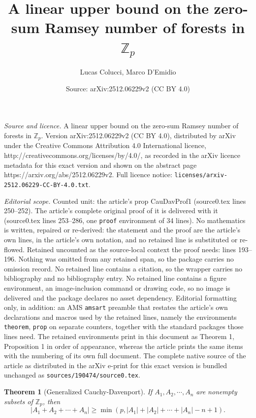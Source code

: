 \documentclass[10pt,a4paper]{amsart}
\title{A linear upper bound on the zero-sum Ramsey number of forests in $\mathbb{Z}_p$}
\author{Lucas Colucci, Marco D'Emidio}
\date{Source: arXiv:2512.06229v2 (CC BY 4.0)}
\newtheorem{theorem}{Theorem}
\begin{document}
\maketitle

\noindent\emph{Source and licence.} A linear upper bound on the zero-sum Ramsey number of forests in $\mathbb{Z}_p$. Version arXiv:2512.06229v2 (CC BY 4.0), distributed by arXiv under the Creative Commons Attribution 4.0 International licence, http://creativecommons.org/licenses/by/4.0/, as recorded in the arXiv licence metadata for this exact version and shown on the abstract page https://arxiv.org/abs/2512.06229v2. Full licence notice: \texttt{licenses/arxiv-2512.06229-CC-BY-4.0.txt}.\par\smallskip

\noindent\textit{Editorial scope.} Counted unit: the article's prop CauDavProf1 (source0.tex lines 250--252). The article's complete original proof of it is delivered with it (source0.tex lines 253--286, one \texttt{proof} environment of 34 lines). No mathematics is written, repaired or re-derived: the statement and the proof are the article's own lines, in the article's own notation, and no retained line is substituted or re-flowed.  Retained uncounted as the source-local context the proof needs: lines 193--196.  Nothing was omitted from any retained span, so the package carries no omission record.  No retained line contains a citation, so the wrapper carries no bibliography and no bibliography entry.  No retained line contains a figure environment, an image-inclusion command or drawing code, so no image is delivered and the package declares no asset dependency.  Editorial formatting only, in addition: an AMS \texttt{amsart} preamble that restates the article's own declarations and macros used by the retained lines, namely the environments \texttt{theorem}, \texttt{prop} on separate counters, together with the standard packages those lines need.  The retained environments print in this document as Theorem 1, Proposition 1 in order of appearance, whereas the article prints the same items with the numbering of its own full document.  The complete native source of the article as distributed in the arXiv e-print for this exact version is bundled unchanged as \texttt{sources/190474/source0.tex}.
\begin{theorem}[Generalized Cauchy-Davenport] \label{thm:CauDav}
    If $A_1,A_2,\cdots,A_n$ are nonempty subsets of $\mathbb{Z}_p$, then
    $$|A_1+A_2+\cdots+A_n| \geq \min(p,|A_1|+|A_2|+\cdots+|A_n|-n+1).$$
\end{theorem}
\end{document}
